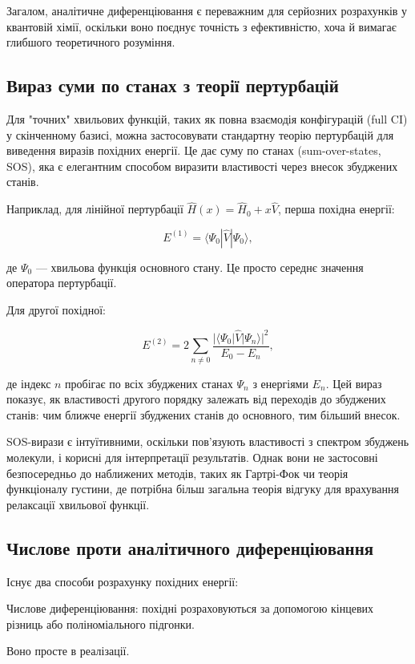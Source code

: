 \documentclass{PySCFBook}
\begin{document}
Загалом, аналітичне диференціювання є переважним для серйозних розрахунків у квантовій хімії, оскільки воно поєднує точність з ефективністю, хоча й вимагає глибшого теоретичного розуміння.

\subsection{Вираз суми по станах з теорії пертурбацій}

Для "точних" хвильових функцій, таких як повна взаємодія конфігурацій (full CI) у скінченному базисі, можна застосовувати стандартну теорію пертурбацій для виведення виразів похідних енергії. Це дає суму по станах (sum-over-states, SOS), яка є елегантним способом виразити властивості через внесок збуджених станів.

Наприклад, для лінійної пертурбації \(\hat{H}(x) = \hat{H}_0 + x \hat{V}\), перша похідна енергії:

\[
E^{(1)} = \langle \Psi_0 | \hat{V} | \Psi_0 \rangle,
\]

де \(\Psi_0\) — хвильова функція основного стану. Це просто середнє значення оператора пертурбації.

Для другої похідної:

\[
E^{(2)} = 2 \sum_{n \neq 0} \frac{|\langle \Psi_0 | \hat{V} | \Psi_n \rangle|^2}{E_0 - E_n},
\]

де індекс \(n\) пробігає по всіх збуджених станах \(\Psi_n\) з енергіями \(E_n\). Цей вираз показує, як властивості другого порядку залежать від переходів до збуджених станів: чим ближче енергії збуджених станів до основного, тим більший внесок.

SOS-вирази є інтуїтивними, оскільки пов'язують властивості з спектром збуджень молекули, і корисні для інтерпретації результатів. Однак вони не застосовні безпосередньо до наближених методів, таких як Гартрі-Фок чи теорія функціоналу густини, де потрібна більш загальна теорія відгуку для врахування релаксації хвильової функції.

\subsection{Числове проти аналітичного диференціювання}

Існує два способи розрахунку похідних енергії:

Числове диференціювання: похідні розраховуються за допомогою кінцевих різниць або поліноміального підгонки.

Воно просте в реалізації.
\end{document}
